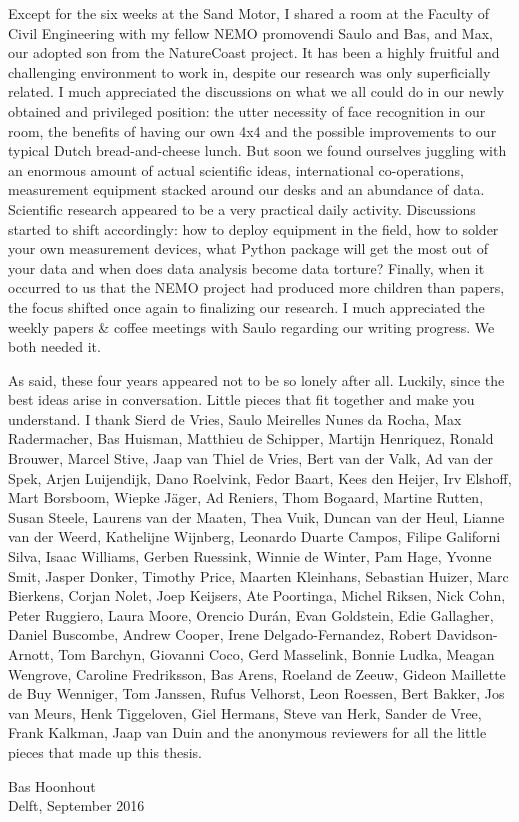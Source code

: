 Except for the six weeks at the Sand Motor, I shared a room at the
Faculty of Civil Engineering with my fellow NEMO promovendi Saulo and
Bas, and Max, our adopted son from the NatureCoast project. It has
been a highly fruitful and challenging environment to work in, despite
our research was only superficially related. I much appreciated the
discussions on what we all could do in our newly obtained and
privileged position: the utter necessity of face recognition in our
room, the benefits of having our own 4x4 and the possible improvements
to our typical Dutch bread-and-cheese lunch. But soon we found
ourselves juggling with an enormous amount of actual scientific ideas,
international co-operations, measurement equipment stacked around our
desks and an abundance of data. Scientific research appeared to be a
very practical daily activity. Discussions started to shift
accordingly: how to deploy equipment in the field, how to solder your
own measurement devices, what Python package will get the most out of
your data and when does data analysis become data torture? Finally,
when it occurred to us that the NEMO project had produced more
children than papers, the focus shifted once again to finalizing our
research. I much appreciated the weekly papers \& coffee meetings with
Saulo regarding our writing progress. We both needed it.

As said, these four years appeared not to be so lonely after
all. Luckily, since the best ideas arise in conversation. Little
pieces that fit together and make you understand. I thank
Sierd de Vries,
Saulo Meirelles Nunes da Rocha,
Max Radermacher,
Bas Huisman,
Matthieu de Schipper,
Martijn Henriquez,
Ronald Brouwer,
Marcel Stive,
Jaap van Thiel de Vries,
Bert van der Valk,
Ad van der Spek,
Arjen Luijendijk,
Dano Roelvink,
Fedor Baart,
Kees den Heijer,
Irv Elshoff,
Mart Borsboom,
Wiepke J{\"a}ger,
Ad Reniers,
Thom Bogaard,
Martine Rutten,
Susan Steele,
Laurens van der Maaten,
Thea Vuik,
Duncan van der Heul,
Lianne van der Weerd,
Kathelijne Wijnberg,
Leonardo Duarte Campos,
Filipe Galiforni Silva,
Isaac Williams,
Gerben Ruessink,
Winnie de Winter,
Pam Hage,
Yvonne Smit,
Jasper Donker,
Timothy Price,
Maarten Kleinhans,
Sebastian Huizer,
Marc Bierkens,
Corjan Nolet,
Joep Keijsers,
Ate Poortinga,
Michel Riksen,
Nick Cohn,
Peter Ruggiero,
Laura Moore,
Orencio Dur{\'a}n,
Evan Goldstein,
Edie Gallagher,
Daniel Buscombe,
Andrew Cooper,
Irene Delgado-Fernandez,
Robert Davidson-Arnott,
Tom Barchyn,
Giovanni Coco,
Gerd Masselink,
Bonnie Ludka,
Meagan Wengrove,
Caroline Fredriksson,
Bas Arens,
Roeland de Zeeuw,
Gideon Maillette de Buy Wenniger,
Tom Janssen,
Rufus Velhorst,
Leon Roessen,
Bert Bakker,
Jos van Meurs,
Henk Tiggeloven,
Giel Hermans,
Steve van Herk,
Sander de Vree,
Frank Kalkman,
Jaap van Duin
and the anonymous reviewers
for all the little pieces that made up this thesis.

\bigskip

\begin{flushright}
  Bas Hoonhout \\
  Delft, September 2016
\end{flushright}


